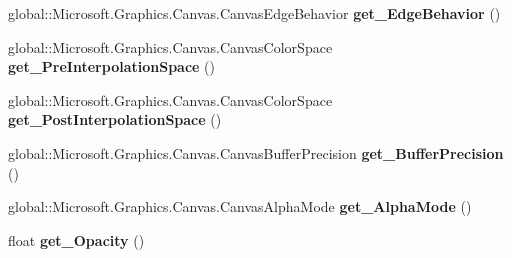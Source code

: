 \begin{DoxyCompactItemize}
\item 
\mbox{\label{class_microsoft_1_1_graphics_1_1_canvas_1_1_brushes_1_1_canvas_radial_gradient_brush_af7577b45ab358ef09d908697b38bdf10}} 
global\+::\+Microsoft.\+Graphics.\+Canvas.\+Canvas\+Edge\+Behavior {\bfseries get\+\_\+\+Edge\+Behavior} ()
\item 
\mbox{\label{class_microsoft_1_1_graphics_1_1_canvas_1_1_brushes_1_1_canvas_radial_gradient_brush_aa72bdc01bbe7dd17dd854e9bb242e6c9}} 
global\+::\+Microsoft.\+Graphics.\+Canvas.\+Canvas\+Color\+Space {\bfseries get\+\_\+\+Pre\+Interpolation\+Space} ()
\item 
\mbox{\label{class_microsoft_1_1_graphics_1_1_canvas_1_1_brushes_1_1_canvas_radial_gradient_brush_a785455e32693ce5dfe7078cfda12ceb4}} 
global\+::\+Microsoft.\+Graphics.\+Canvas.\+Canvas\+Color\+Space {\bfseries get\+\_\+\+Post\+Interpolation\+Space} ()
\item 
\mbox{\label{class_microsoft_1_1_graphics_1_1_canvas_1_1_brushes_1_1_canvas_radial_gradient_brush_aafd2f6623623d25c32311c900cbd8290}} 
global\+::\+Microsoft.\+Graphics.\+Canvas.\+Canvas\+Buffer\+Precision {\bfseries get\+\_\+\+Buffer\+Precision} ()
\item 
\mbox{\label{class_microsoft_1_1_graphics_1_1_canvas_1_1_brushes_1_1_canvas_radial_gradient_brush_acc50a38d650db9d56c06e7ceccffd903}} 
global\+::\+Microsoft.\+Graphics.\+Canvas.\+Canvas\+Alpha\+Mode {\bfseries get\+\_\+\+Alpha\+Mode} ()
\item 
\mbox{\label{class_microsoft_1_1_graphics_1_1_canvas_1_1_brushes_1_1_canvas_radial_gradient_brush_acd71a294a1a4501f8a3a2b41d2e7af17}} 
float {\bfseries get\+\_\+\+Opacity} ()
\item 
\mbox{\label{class_microsoft_1_1_graphics_1_1_canvas_1_1_brushes_1_1_canvas_radial_gradient_brush_a16b901b253e0b85c05eeb242450257a6}} 

\end{DoxyCompactItemize}
